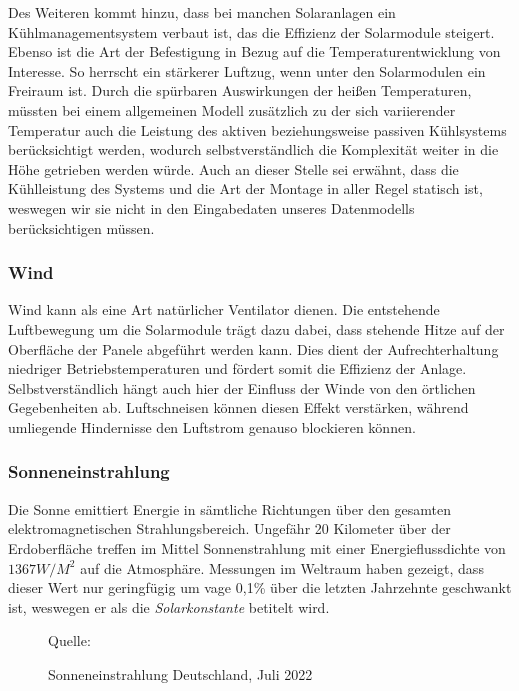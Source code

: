 \documentclass[12pt, a4paper]{article}
\begin{document}
Des Weiteren kommt hinzu, dass bei manchen Solaranlagen ein Kühlmanagementsystem verbaut ist, das die Effizienz der Solarmodule steigert. Ebenso ist die Art der Befestigung in Bezug auf die Temperaturentwicklung von Interesse. So herrscht ein stärkerer Luftzug, wenn unter den Solarmodulen ein Freiraum ist. Durch die spürbaren Auswirkungen der heißen Temperaturen, müssten bei einem allgemeinen Modell zusätzlich zu der sich variierender Temperatur auch die Leistung des aktiven beziehungsweise passiven Kühlsystems berücksichtigt werden, wodurch selbstverständlich die Komplexität weiter in die Höhe getrieben werden würde. Auch an dieser Stelle sei erwähnt, dass die Kühlleistung des Systems und die Art der Montage in aller Regel statisch ist, weswegen wir sie nicht in den Eingabedaten unseres Datenmodells berücksichtigen müssen.

\subsubsection{Wind}

Wind kann als eine Art natürlicher Ventilator dienen. Die entstehende Luftbewegung um die Solarmodule trägt dazu dabei, dass stehende Hitze auf der Oberfläche der Panele abgeführt werden kann. Dies dient der Aufrechterhaltung niedriger Betriebstemperaturen und fördert somit die Effizienz der Anlage. Selbstverständlich hängt auch hier der Einfluss der Winde von den örtlichen Gegebenheiten ab. Luftschneisen können diesen Effekt verstärken, während umliegende Hindernisse den Luftstrom genauso blockieren können.

\subsubsection{Sonneneinstrahlung}

Die Sonne emittiert Energie in sämtliche Richtungen über den gesamten elektromagnetischen Strahlungsbereich. Ungefähr 20 Kilometer über der Erdoberfläche treffen im Mittel Sonnenstrahlung mit einer Energieflussdichte von $1367 W/M^2$ auf die Atmosphäre. Messungen im Weltraum haben gezeigt, dass dieser Wert nur geringfügig um vage 0,1\% über die letzten Jahrzehnte geschwankt ist, weswegen er als die \textit{Solarkonstante} betitelt wird. 

\begin{figure}
\centering
\def\svgwidth{350pt}

\caption*{\scriptsize{Quelle: \cite{ws:dwdradiation}}}
\caption{Sonneneinstrahlung Deutschland, Juli 2022}
\label{fig:sonneneinstrahlung}
\end {figure}
\end{document}
